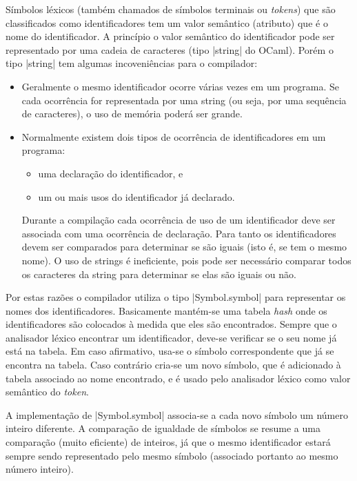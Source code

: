 \documentclass[a4paper,11pt,brazil]{article}
\begin{document}
Símbolos léxicos (também chamados de símbolos terminais ou
\emph{tokens}) que são classificados como identificadores tem um valor
semântico (atributo) que é o nome do identificador. A princípio o
valor semântico do identificador pode ser representado por uma cadeia
de caracteres (tipo \pyginline|string| do OCaml). Porém o tipo
\pyginline|string| tem algumas incoveniências para o compilador:
\begin{itemize}
  \item Geralmente o mesmo identificador ocorre várias vezes em um
  programa. Se cada ocorrência for representada por uma string (ou
  seja, por uma sequência de caracteres), o uso de memória poderá ser
  grande.

  \item Normalmente existem dois tipos de ocorrência de
  identificadores em um programa:
  \begin{itemize}
    \item uma declaração do identificador, e
    \item um ou mais usos do identificador já declarado.
  \end{itemize}
  Durante a compilação cada ocorrência de uso de um identificador deve
  ser associada com uma ocorrência de declaração. Para tanto os
  identificadores devem ser comparados para determinar se são iguais
  (isto é, se tem o mesmo nome). O uso de strings é ineficiente, pois
  pode ser necessário comparar todos os caracteres da string para
  determinar se elas são iguais ou não.
\end{itemize}

Por estas razões o compilador utiliza o tipo \pyginline|Symbol.symbol|
para representar os nomes dos identificadores. Basicamente mantém-se
uma tabela \emph{hash} onde os identificadores são colocados à medida
que eles são encontrados. Sempre que o analisador léxico encontrar um
identificador, deve-se verificar se o seu nome já está na tabela. Em
caso afirmativo, usa-se o símbolo correspondente que já se encontra na
tabela. Caso contrário cria-se um novo símbolo, que é adicionado à
tabela associado ao nome encontrado, e é usado pelo analisador léxico
como valor semântico do \emph{token}.

A implementação de \pyginline|Symbol.symbol| associa-se a cada novo
símbolo um número inteiro diferente. A comparação de igualdade de
símbolos se resume a uma comparação (muito eficiente) de inteiros, já
que o mesmo identificador estará sempre sendo representado pelo mesmo
símbolo (associado portanto ao mesmo número inteiro).
\end{document}
